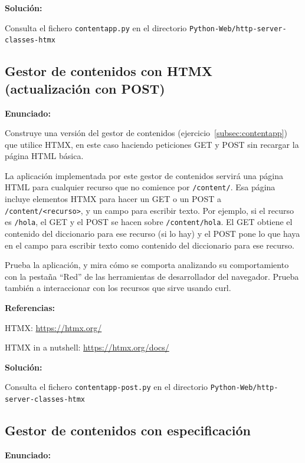 \textbf{Solución:}

Consulta el fichero \texttt{contentapp.py} en el directorio \texttt{Python-Web/http-server-classes-htmx}

\subsection{Gestor de contenidos con HTMX (actualización con POST)}
\label{subsec:contentapp-htmx-post}

\textbf{Enunciado:}

Construye una versión del gestor de contenidos (ejercicio~\ref{subsec:contentapp}) que utilice HTMX, en este caso haciendo peticiones GET y POST sin recargar la página HTML básica.

La aplicación implementada por este gestor de contenidos servirá una página HTML para cualquier recurso que no comience por \verb|/content/|. Esa página incluye elementos HTMX para hacer un GET o un POST a \verb|/content/<recurso>|, y un campo para escribir texto. Por ejemplo, si el recurso es \verb|/hola|, el GET y el POST se hacen sobre \verb|/content/hola|. El GET obtiene el contenido del diccionario para ese recurso (si lo hay) y el POST pone lo que haya en el campo para escribir texto como contenido del diccionario para ese recurso.

Prueba la aplicación, y mira cómo se comporta analizando su comportamiento con la pestaña ``Red'' de las herramientas de desarrollador del navegador. Prueba también a interaccionar con los recursos que sirve usando curl.

\textbf{Referencias:}

HTMX: \url{https://htmx.org/}

HTMX in a nutshell: \url{https://htmx.org/docs/}

\textbf{Solución:}

Consulta el fichero \texttt{contentapp-post.py} en el directorio \texttt{Python-Web/http-server-classes-htmx}

\subsection{Gestor de contenidos con especificación}
\label{subsec:contenidos-spec}

\textbf{Enunciado:}


